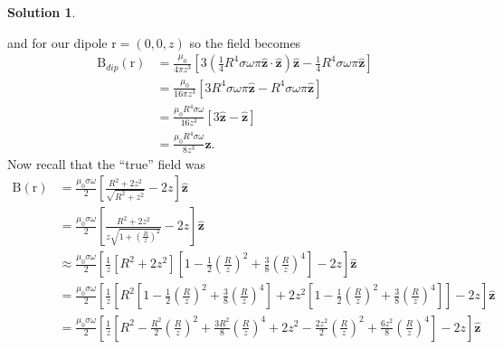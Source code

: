 \documentclass[10pt]{article}
\theoremstyle{definition}
\newtheorem{soln}{Solution}
\newcommand{\uz}{\hat{\mathbf{z}}}
\newcommand{\bv}[1]{\bm{\mathrm{#1}}}
\begin{document}
\begin{soln}
\begin{enumerate}[label=(\alph*)]
          and for our dipole $\bv{r}=(0,0,z)$ so the field becomes
          \begin{align*}
            \bv{B}_{dip}(\bv{r}) & =\frac{\mu_0}{4\pi z^3}\left[3\left(\frac{1}{4}R^4\sigma\omega\pi\uz\cdot \uz\right)\uz-\frac{1}{4}R^4\sigma\omega\pi\uz\right] \\
                                 & =\frac{\mu_0}{16\pi z^3}\left[3R^4\sigma\omega\pi\uz-R^4\sigma\omega\pi\uz\right]                                               \\
                                 & =\frac{\mu_0R^4 \sigma\omega}{16 z^3}\left[3\uz-\uz\right]                                                                      \\
                                 & =\frac{\mu_0R^4 \sigma\omega}{8z^3}\uz.
          \end{align*}
          Now recall that the ``true'' field was
          \begin{align*}
            \bv{B}(\bv{r}) & =\frac{\mu_0 \sigma \omega }{2}\left[\frac{R^2+2z^2}{\sqrt{R^2+z^2}}-2z\right]\uz                                                                                                                                                                                      \\
                           & =\frac{\mu_0 \sigma \omega }{2}\left[\frac{R^2+2z^2}{z\sqrt{1+\left(\frac{R}{z}\right)^2}}-2z\right]\uz                                                                                                                                                                \\
                           & \approx \frac{\mu_0 \sigma \omega }{2}\left[\frac{1}{z}\left[R^2+2z^2\right]\left[1-\frac{1}{2}\left(\frac{R}{z}\right)^2+\frac{3}{8}\left(\frac{R}{z}\right)^4\right]-2z\right]\uz                                                                                    \\
                           & =\frac{\mu_0 \sigma \omega }{2}\left[\frac{1}{z}\left[R^2\left[1-\frac{1}{2}\left(\frac{R}{z}\right)^2+\frac{3}{8}\left(\frac{R}{z}\right)^4\right]+2z^2\left[1-\frac{1}{2}\left(\frac{R}{z}\right)^2+\frac{3}{8}\left(\frac{R}{z}\right)^4\right]\right]-2z\right]\uz \\
                           & =\frac{\mu_0 \sigma \omega }{2}\left[\frac{1}{z}\left[R^2-\frac{R^2}{2}\left(\frac{R}{z}\right)^2+\frac{3R^2}{8}\left(\frac{R}{z}\right)^4+2z^2-\frac{2z^2}{2}\left(\frac{R}{z}\right)^2+\frac{6z^2}{8}\left(\frac{R}{z}\right)^4\right]-2z\right]\uz                  \\

\end{align*}
\end{enumerate}
\end{soln}
\end{document}

